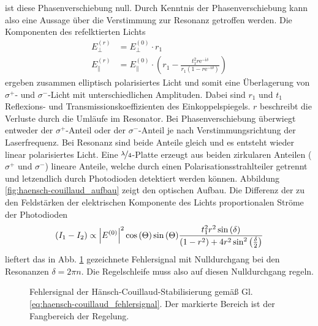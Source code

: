 ist diese Phasenverschiebung null. Durch Kenntnis der Phasenverschiebung kann
also eine Aussage über die Verstimmung zur Resonanz getroffen werden. Die
Komponenten des refelktierten Lichts
\begin{equation}\label{eq:haensch-couillaud_02}
	\begin{split}
		E_{\perp}^{(r)} & = E_{\perp}^{(0)}\cdot r_1\\
		E_{\parallel}^{(r)} & = E_{\parallel}^{(0)}\cdot\left(r_1-\frac{t_1^2r\mathrm{e}^{-\mathrm{i}\delta}}{r_1\left(1-r\mathrm{e}^{-\mathrm{i}\delta}\right)}\right)
	\end{split}
\end{equation}
ergeben zusammen elliptisch polarisiertes Licht und somit eine Überlagerung von
$\sigma^+$- und $\sigma^-$-Licht mit unterschiedlichen Amplituden. Dabei sind
$r_1$ und $t_1$ Reflexions- und Transmissionskoeffizienten des
Einkoppelspiegels. $r$ beschreibt die Verluste durch die Umläufe im Resonator.
Bei Phasenverschiebung überwiegt entweder der $\sigma^+$-Anteil oder der
$\sigma^-$-Anteil je nach Verstimmungsrichtung der Laserfrequenz.
Bei Resonanz sind beide Anteile gleich und es entsteht wieder linear polarisiertes Licht. Eine $\nicefrac{\lambda}{4}$-Platte erzeugt aus beiden zirkularen Anteilen ($\sigma^+$ und $\sigma^-$) lineare Anteile, welche durch einen Polarisationsstrahlteiler getrennt und letzendlich durch Photodioden
detektiert werden können. Abbildung \ref{fig:haensch-couillaud_aufbau} zeigt den
optischen Aufbau. Die Differenz der zu den Feldstärken der elektrischen Komponente
des Lichts proportionalen Ströme der Photodioden
\begin{equation}\label{eq:haensch-couillaud_fehlersignal}
	(I_1-I_2)\propto\left|E^{(0)}\right|^2\cos{(\Theta)}\sin{(\Theta)}\frac{t_1^2r^2\sin{(\delta)}}{(1-r^2)+4r^2\sin^2{\left(\frac{\delta}{2}\right)}}
\end{equation}
lieftert das in Abb. \ref{fig:haensch-couillaud_fehlersignal} gezeichnete
Fehlersignal mit Nulldurchgang bei den Resonanzen $\delta=2\pi n$. Die
Regelschleife muss also auf diesen Nulldurchgang regeln.
\begin{figure}[h]
	\centering
	\footnotesize
	
	\caption[Hänsch-Couillaud - Fehlersignal]{Fehlersignal der
	Hänsch-Couillaud-Stabilisierung
	gemäß Gl.
	\eqref{eq:haensch-couillaud_fehlersignal}.
	Der markierte Bereich ist der
	Fangbereich der Regelung.}\label{fig:haensch-couillaud_fehlersignal}
\end{figure}

